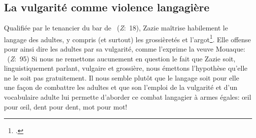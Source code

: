 \subsection{La vulgarité comme violence langagière}
Qualifiée par le tenancier du bar de ~(\textit{Z}:~18), Zazie maîtrise habilement le langage des adultes, y compris (et surtout) les grossièretés et l'argot\footcite[88]{Maurin2007}.
Elle offense pour ainsi dire les adultes par sa vulgarité, comme l'exprime la veuve Mouaque: ~(\textit{Z}:~95)
Si nous ne remettons aucunement en question le fait que Zazie soit, linguistiquement parlant, vulgaire et grossière, nous émettons l'hypothèse qu'elle ne le soit pas gratuitement.
Il nous semble plutôt que le langage soit pour elle une façon de combattre les adultes et que son l'emploi de la vulgarité et d'un vocabulaire adulte lui permette d'aborder ce combat langagier à armes égales: \oe{}il pour \oe{}il, dent pour dent, mot pour mot!

